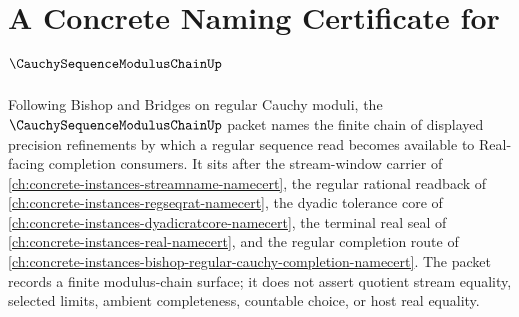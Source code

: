 \chapter{A Concrete Naming Certificate for $\CauchySequenceModulusChainUp$}
\label{ch:concrete-instances-cauchy-sequence-modulus-chain-namecert}

Following Bishop and Bridges on regular Cauchy moduli, the $\CauchySequenceModulusChainUp$ packet names the finite chain of displayed precision refinements by which a regular sequence read becomes available to Real-facing completion consumers. It sits after the stream-window carrier of \autoref{ch:concrete-instances-streamname-namecert}, the regular rational readback of \autoref{ch:concrete-instances-regseqrat-namecert}, the dyadic tolerance core of \autoref{ch:concrete-instances-dyadicratcore-namecert}, the terminal real seal of \autoref{ch:concrete-instances-real-namecert}, and the regular completion route of \autoref{ch:concrete-instances-bishop-regular-cauchy-completion-namecert}. The packet records a finite modulus-chain surface; it does not assert quotient stream equality, selected limits, ambient completeness, countable choice, or host real equality.

